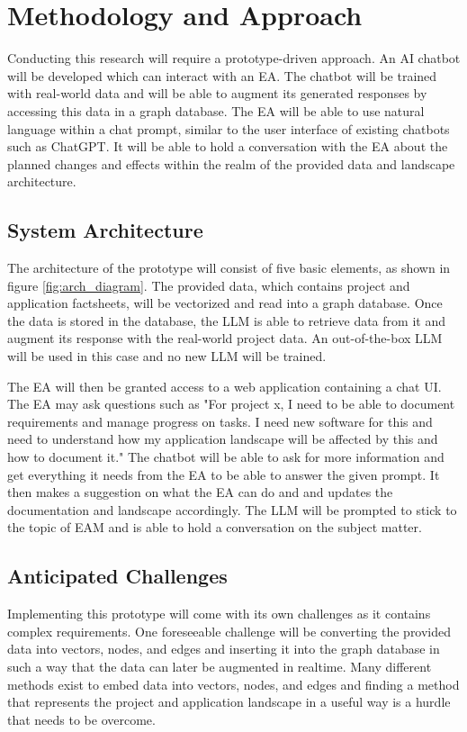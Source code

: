 \documentclass[english]{lni}
\begin{document}
\section{Methodology and Approach}
Conducting this research will require a prototype-driven approach. An AI chatbot will be developed which can interact with an EA. The chatbot will be trained with real-world data and will be able to augment its generated responses by accessing this data in a graph database. The EA will be able to use natural language within a chat prompt, similar to the user interface of existing chatbots such as ChatGPT. It will be able to hold a conversation with the EA about the planned changes and effects within the realm of the provided data and landscape architecture.

\subsection{System Architecture}
The architecture of the prototype will consist of five basic elements, as shown in figure \ref{fig:arch_diagram}. The provided data, which contains project and application factsheets, will be vectorized and read into a graph database. Once the data is stored in the database, the LLM is able to retrieve data from it and augment its response with the real-world project data. An out-of-the-box LLM will be used in this case and no new LLM will be trained.

The EA will then be granted access to a web application containing a chat UI. The EA may ask questions such as "For project x, I need to be able to document requirements and manage progress on tasks. I need new software for this and need to understand how my application landscape will be affected by this and how to document it." The chatbot will be able to ask for more information and get everything it needs from the EA to be able to answer the given prompt. It then makes a suggestion on what the EA can do and and updates the documentation and landscape accordingly. The LLM will be prompted to stick to the topic of EAM and is able to hold a conversation on the subject matter.

\subsection{Anticipated Challenges}
Implementing this prototype will come with its own challenges as it contains complex requirements. One foreseeable challenge will be converting the provided data into vectors, nodes, and edges and inserting it into the graph database in such a way that the data can later be augmented in realtime. Many different methods exist to embed data into vectors, nodes, and edges and finding a method that represents the project and application landscape in a useful way is a hurdle that needs to be overcome.\cite{grohe2020word2vec}
\end{document}
